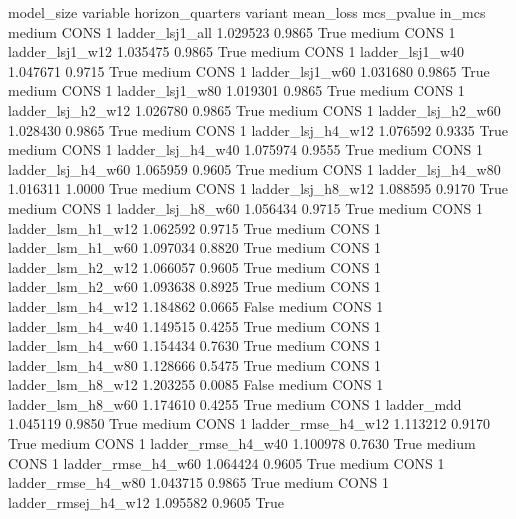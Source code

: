 model_size variable  horizon_quarters             variant  mean_loss  mcs_pvalue  in_mcs
    medium     CONS                 1     ladder_lsj1_all   1.029523      0.9865    True
    medium     CONS                 1     ladder_lsj1_w12   1.035475      0.9865    True
    medium     CONS                 1     ladder_lsj1_w40   1.047671      0.9715    True
    medium     CONS                 1     ladder_lsj1_w60   1.031680      0.9865    True
    medium     CONS                 1     ladder_lsj1_w80   1.019301      0.9865    True
    medium     CONS                 1   ladder_lsj_h2_w12   1.026780      0.9865    True
    medium     CONS                 1   ladder_lsj_h2_w60   1.028430      0.9865    True
    medium     CONS                 1   ladder_lsj_h4_w12   1.076592      0.9335    True
    medium     CONS                 1   ladder_lsj_h4_w40   1.075974      0.9555    True
    medium     CONS                 1   ladder_lsj_h4_w60   1.065959      0.9605    True
    medium     CONS                 1   ladder_lsj_h4_w80   1.016311      1.0000    True
    medium     CONS                 1   ladder_lsj_h8_w12   1.088595      0.9170    True
    medium     CONS                 1   ladder_lsj_h8_w60   1.056434      0.9715    True
    medium     CONS                 1   ladder_lsm_h1_w12   1.062592      0.9715    True
    medium     CONS                 1   ladder_lsm_h1_w60   1.097034      0.8820    True
    medium     CONS                 1   ladder_lsm_h2_w12   1.066057      0.9605    True
    medium     CONS                 1   ladder_lsm_h2_w60   1.093638      0.8925    True
    medium     CONS                 1   ladder_lsm_h4_w12   1.184862      0.0665   False
    medium     CONS                 1   ladder_lsm_h4_w40   1.149515      0.4255    True
    medium     CONS                 1   ladder_lsm_h4_w60   1.154434      0.7630    True
    medium     CONS                 1   ladder_lsm_h4_w80   1.128666      0.5475    True
    medium     CONS                 1   ladder_lsm_h8_w12   1.203255      0.0085   False
    medium     CONS                 1   ladder_lsm_h8_w60   1.174610      0.4255    True
    medium     CONS                 1          ladder_mdd   1.045119      0.9850    True
    medium     CONS                 1  ladder_rmse_h4_w12   1.113212      0.9170    True
    medium     CONS                 1  ladder_rmse_h4_w40   1.100978      0.7630    True
    medium     CONS                 1  ladder_rmse_h4_w60   1.064424      0.9605    True
    medium     CONS                 1  ladder_rmse_h4_w80   1.043715      0.9865    True
    medium     CONS                 1 ladder_rmsej_h4_w12   1.095582      0.9605    True
